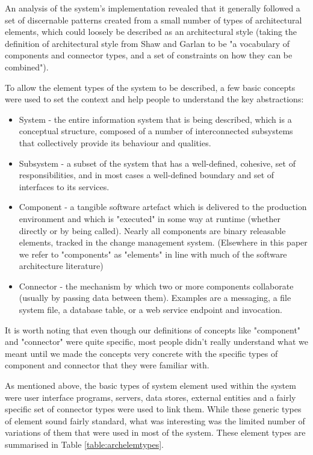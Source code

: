   An analysis of the system's implementation revealed that it generally followed a set of discernable patterns created from a small number of types of architectural elements, which could loosely be described as an architectural style (taking the definition of architectural style from Shaw and Garlan \cite{shaw1996-softwarearch} to be "a vocabulary of components and connector types, and a set of constraints on how they can be combined").  

  To allow the element types of the system to be described, a few basic concepts were used to set the context and help people to understand the key abstractions:

\begin{itemize}
\item System - the entire information system that is being described, which is a conceptual structure, composed of a number of interconnected subsystems that collectively provide its behaviour and qualities.

\item Subsystem - a subset of the system that has a well-defined, cohesive, set of responsibilities, and in most cases a well-defined boundary and set of interfaces to its services.

\item Component - a tangible software artefact which is delivered to the production environment and which is "executed" in some way at runtime (whether directly or by being called). Nearly all components are binary releasable elements, tracked in the change management system. (Elsewhere in this paper we refer to "components" as "elements" in line with much of the software architecture literature)

\item Connector - the mechanism by which two or more components collaborate (usually by passing data between them).  Examples are a messaging, a file system file, a database table, or a web service endpoint and invocation.

\end{itemize}

  It is worth noting that even though our definitions of concepts like "component" and "connector" were quite specific, most people didn't really understand what we meant until we made the concepts very concrete with the specific types of component and connector that they were familiar with.

  As mentioned above, the basic types of system element used within the system were user interface programs, servers, data stores, external entities and a fairly specific set of connector types were used to link them.  While these generic types of element sound fairly standard, what was interesting was the limited number of variations of them that were used in most of the system.  These element types are summarised in Table \ref{table:archelemtypes}.

